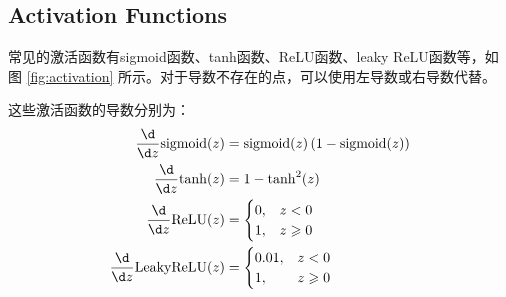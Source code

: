 \subsection{Activation Functions}

常见的激活函数有sigmoid函数、tanh函数、ReLU函数、leaky ReLU函数等，如图 \ref{fig:activation} 所示。对于导数不存在的点，可以使用左导数或右导数代替。

\begin{figure*}[h!bt]
    \centering

    \centering
    \caption{Activation Functions}
    \label{fig:activation}
\end{figure*}

这些激活函数的导数分别为：
\begin{equation}
    \begin{aligned}
        \frac{\d }{\d z}\mathrm{sigmoid}(z) &= \mathrm{sigmoid}(z)\left(1-\mathrm{sigmoid}(z)\right) \\
        \frac{\d }{\d z}\mathrm{tanh}(z) &= 1 - \mathrm{tanh}^2(z) \\
        \frac{\d }{\d z}\mathrm{ReLU}(z) &= 
            \begin{cases}
                0, &z < 0 \\
                1, &z \geqslant 0
            \end{cases}\\
        \frac{\d }{\d z}\mathrm{LeakyReLU}(z) &= 
            \begin{cases}
                0.01, &z < 0 \\
                1, &z \geqslant 0
            \end{cases}
    \end{aligned}
\end{equation}


